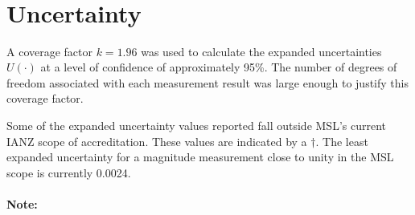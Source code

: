 \documentclass[IANZ]{MSLCalCert}
\begin{document}
\begin{center}
\begin{singlespace}
\[\begin{array}{SSSSS}
		\end{array}
	\]
	
\end{singlespace}
\end{center}


\section{Uncertainty}
A coverage factor $k=1.96$ was used to calculate the expanded uncertainties $U(\cdot)$ at a level of confidence of approximately 95\%. The number of degrees of freedom associated with each measurement result was large enough to justify this coverage factor.  

Some of the expanded uncertainty values reported fall outside MSL's current IANZ scope of accreditation. These values are indicated by a $\dagger$. The least expanded uncertainty for a magnitude measurement close to unity in the MSL scope is currently 0.0024. 

\paragraph{Note:} 	%



\chiefMetrologist{
Mark Clarkson
}%

\signaturesAB
\end{document}

